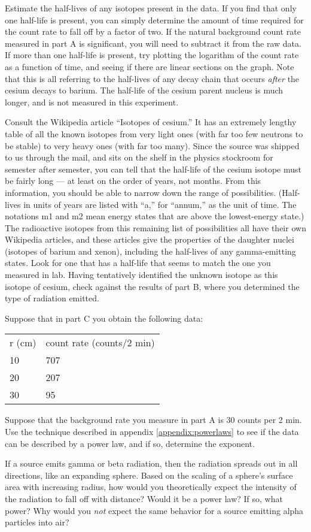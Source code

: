 Estimate the half-lives of any isotopes present in the data. If you find that only one
half-life is present, you can simply determine the 
amount of time required for the count rate to fall off by a factor of two.
If the natural background count rate measured in part A is significant, you will need to subtract it from the raw data.
If more than one half-life is present, try plotting the logarithm of the count rate
as a function of time, and seeing if there are linear sections on the graph.
Note that this is all referring to the half-lives of any decay chain that occurs
\emph{after} the cesium decays to barium. The half-life of the cesium parent
nucleus is much longer, and is not measured in this experiment.

Consult the Wikipedia article ``Isotopes of cesium.'' It has an extremely lengthy
table of all the known isotopes from very light ones (with far too few neutrons to
be stable) to very heavy ones (with far too many). Since the source was shipped to us
through the mail, and sits on the shelf in the physics stockroom for semester after
semester, you can tell that the half-life of the cesium isotope must be fairly long ---
at least on the order of years, not months. From this information, you should be able
to narrow down the range of possibilities. (Half-lives in units of years are listed with
``a,'' for ``annum,'' as the unit of time. The notations m1 and m2 mean energy states
that are above the lowest-energy state.) The radioactive isotopes from this remaining
list of possibilities all have their own Wikipedia articles, and these articles give
the properties of the daughter nuclei (isotopes of barium and xenon), including the half-lives
of any gamma-emitting states. Look for one that has a half-life that seems to match
the one you measured in lab. Having tentatively identified the unknown isotope as
this isotope of cesium, check against the results of part B, where you determined
the type of radiation emitted.

\prelab

\prelabquestion
Suppose that in part C you obtain the following data:

\begin{tabular}{ll}
r (cm) & count rate (counts/2 min) \\
10      & 707 \\
20     & 207 \\
30     & 95
\end{tabular}

Suppose that the background rate you measure in part A
is 30 counts per 2 min. Use the technique
described in appendix \ref{appendix:powerlaws} to see if the data can be described
by a power law, and if so, determine the exponent.

\prelabquestion
If a source emits gamma or beta radiation, then the radiation spreads out in all
directions, like an expanding sphere. Based on the scaling of a sphere's surface
area with increasing radius, how would you theoretically expect the
intensity of the radiation to fall off with distance? Would it be a power law?
If so, what power? Why would you \emph{not} expect the same behavior for a source
emitting alpha particles into air?

